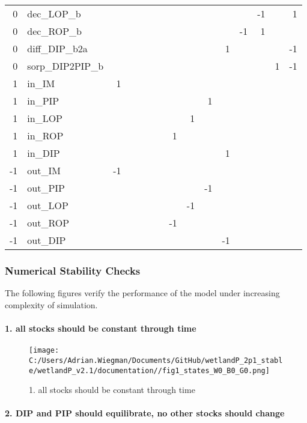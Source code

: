\documentclass[
]{article}
\begin{document}
\begin{longtable}[]{@{}rlrrrrrrrrrrrrr@{}}
0 & dec\_LOP\_b & & & & & & & & & & & -1 & & 1 \\
0 & dec\_ROP\_b & & & & & & & & & & -1 & 1 & & \\
0 & diff\_DIP\_b2a & & & & & & & & & 1 & & & & -1 \\
0 & sorp\_DIP2PIP\_b & & & & & & & & & & & & 1 & -1 \\
1 & in\_IM & 1 & & & & & & & & & & & & \\
1 & in\_PIP & & & & & & & & 1 & & & & & \\
1 & in\_LOP & & & & & & & 1 & & & & & & \\
1 & in\_ROP & & & & & & 1 & & & & & & & \\
1 & in\_DIP & & & & & & & & & 1 & & & & \\
-1 & out\_IM & -1 & & & & & & & & & & & & \\
-1 & out\_PIP & & & & & & & & -1 & & & & & \\
-1 & out\_LOP & & & & & & & -1 & & & & & & \\
-1 & out\_ROP & & & & & & -1 & & & & & & & \\
-1 & out\_DIP & & & & & & & & & -1 & & & & \\
\end{longtable}

\hypertarget{numerical-stability-checks}{%
\subsubsection{Numerical Stability
Checks}\label{numerical-stability-checks}}

The following figures verify the performance of the model under
increasing complexity of simulation.

\hypertarget{all-stocks-should-be-constant-through-time}{%
\paragraph{1. all stocks should be constant through
time}\label{all-stocks-should-be-constant-through-time}}

\begin{figure}
\centering
\texttt{[image: C:/Users/Adrian.Wiegman/Documents/GitHub/wetlandP\_2p1\_stable/wetlandP\_v2.1/documentation//fig1\_states\_W0\_B0\_G0.png]}
\caption{1. all stocks should be constant through time}
\end{figure}

\hypertarget{dip-and-pip-should-equilibrate-no-other-stocks-should-change}{%
\paragraph{2. DIP and PIP should equilibrate, no other stocks should
change}\label{dip-and-pip-should-equilibrate-no-other-stocks-should-change}}
\end{document}

